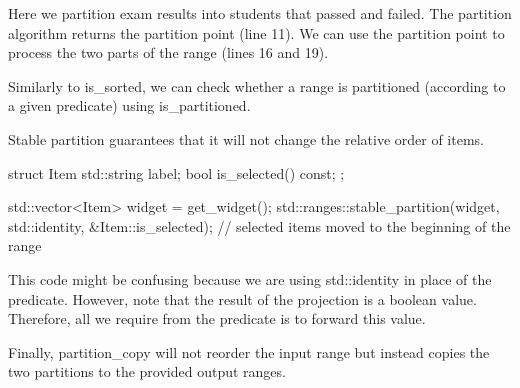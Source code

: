 Here we partition exam results into students that passed and failed. The partition algorithm returns the partition point (line 11). We can use the partition point to process the two parts of the range (lines 16 and 19).

Similarly to is\_sorted, we can check whether a range is partitioned (according to a given predicate) using is\_partitioned.



\begin{box-note}
\end{box-note}

Stable partition guarantees that it will not change the relative order of items.



\begin{box-note}
\begin{cppcode}
struct Item {
    std::string label;
    bool is_selected() const;
};

std::vector<Item> widget = get_widget();
std::ranges::stable_partition(widget, std::identity{}, &Item::is_selected);
// selected items moved to the beginning of the range
\end{cppcode}
\end{box-note}

This code might be confusing because we are using std::identity in place of the predicate. However, note that the result of the projection is a boolean value. Therefore, all we require from the predicate is to forward this value.

Finally, partition\_copy will not reorder the input range but instead copies the two partitions to the provided output ranges.



